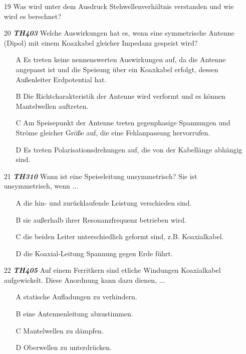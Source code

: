 \begin{enumerate} 
\itemsep1pt\parskip0pt
\item[19] Was wird unter dem Ausdruck Stehwellenverhältnis verstanden und wie wird es berechnet?
\item[20] \emph{\textbf{TH403}}  Welche Auswirkungen hat es, wenn eine symmetrische Antenne (Dipol) mit einem Koaxkabel gleicher Impedanz gespeist wird?
	\begin{enumerate}
	\itemsep1pt\parskip0pt
		\item[A] Es treten keine nennenswerten Auswirkungen auf, da die Antenne angepasst ist und die Speisung über ein Koaxkabel erfolgt, dessen Außenleiter Erdpotential hat.
		\item[B] Die Richtcharakteristik der Antenne wird verformt und es können Mantelwellen auftreten.
		\item[C] Am Speisepunkt der Antenne treten gegenphasige Spannungen und Ströme gleicher Größe auf, die eine Fehlanpassung hervorrufen.
		\item[D] Es treten Polarisationsdrehungen auf, die von der Kabellänge abhängig sind.
	\end{enumerate}
\item[21] \emph{\textbf{TH310}}  Wann ist eine Speiseleitung unsymmetrisch? Sie ist unsymmetrisch, wenn ...
	\begin{enumerate}
	\itemsep1pt\parskip0pt
		\item[A] die hin- und zurücklaufende Leistung verschieden sind.
		\item[B] sie außerhalb ihrer Resonanzfrequenz betrieben wird.
		\item[C] die beiden Leiter unterschiedlich geformt sind, z.B. Koaxialkabel.
		\item[D] die Koaxial-Leitung Spannung gegen Erde führt.
	\end{enumerate}
\item[22] \emph{\textbf{TH405}}  Auf einem Ferritkern sind etliche Windungen Koaxialkabel aufgewickelt. Diese Anordnung kann dazu dienen, ...
	\begin{enumerate}
	\itemsep1pt\parskip0pt
		\item[A] statische Aufladungen zu verhindern.
		\item[B] eine Antennenleitung abzustimmen.
		\item[C] Mantelwellen zu dämpfen.
		\item[D] Oberwellen zu unterdrücken.
	\end{enumerate}
\end{enumerate}

